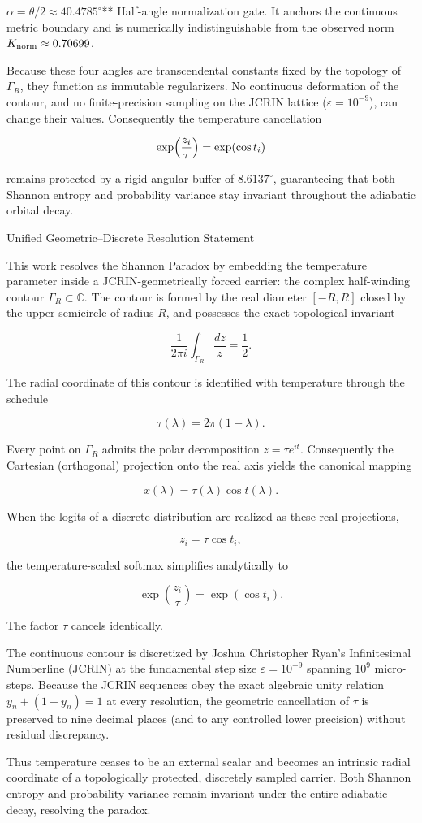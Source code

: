 \(\alpha = \theta/2 \approx 40.4785^\circ\)**  
  Half-angle normalization gate. It anchors the continuous metric boundary and is numerically indistinguishable from the observed norm \(K_{\rm norm}\approx 0.70699\).

Because these four angles are transcendental constants fixed by the topology of \(\Gamma_R\), they function as immutable regularizers. No continuous deformation of the contour, and no finite-precision sampling on the JCRIN lattice (\(\varepsilon=10^{-9}\)), can change their values. Consequently the temperature cancellation

\[
\exp\Bigl(\frac{z_i}{\tau}\Bigr)=\exp(\cos t_i)
\]

remains protected by a rigid angular buffer of \(8.6137^\circ\), guaranteeing that both Shannon entropy and probability variance stay invariant throughout the adiabatic orbital decay.

Unified Geometric–Discrete Resolution Statement

This work resolves the Shannon Paradox by embedding the temperature parameter inside a JCRIN-geometrically forced carrier: the complex half-winding contour \(\Gamma_R\subset\mathbb{C}\). The contour is formed by the real diameter \([-R,R]\) closed by the upper semicircle of radius \(R\), and possesses the exact topological invariant

\[
\frac{1}{2\pi i}\int_{\Gamma_R}\frac{dz}{z}=\frac12.
\]

The radial coordinate of this contour is identified with temperature through the schedule

\[
\tau(\lambda)=2\pi(1-\lambda).
\]

Every point on \(\Gamma_R\) admits the polar decomposition \(z=\tau e^{it}\). Consequently the Cartesian (orthogonal) projection onto the real axis yields the canonical mapping

\[
x(\lambda)=\tau(\lambda)\cos t(\lambda).
\]

When the logits of a discrete distribution are realized as these real projections,

\[
z_i=\tau\cos t_i,
\]

the temperature-scaled softmax simplifies analytically to

\[
\exp\left(\frac{z_i}{\tau}\right)=\exp(\cos t_i).
\]

The factor \(\tau\) cancels identically.  

The continuous contour is discretized by Joshua Christopher Ryan’s Infinitesimal Numberline (JCRIN) at the fundamental step size \(\varepsilon=10^{-9}\) spanning \(10^9\) micro-steps. Because the JCRIN sequences obey the exact algebraic unity relation \(y_n+(1-y_n)=1\) at every resolution, the geometric cancellation of \(\tau\) is preserved to nine decimal places (and to any controlled lower precision) without residual discrepancy.  

Thus temperature ceases to be an external scalar and becomes an intrinsic radial coordinate of a topologically protected, discretely sampled carrier. Both Shannon entropy and probability variance remain invariant under the entire adiabatic decay, resolving the paradox.
